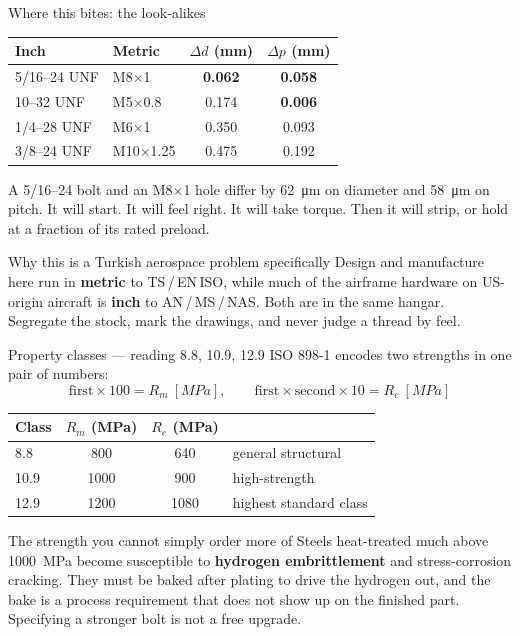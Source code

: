 \documentclass[aspectratio=169,10pt]{beamer}
\begin{document}
\begin{frame}{Where this bites: the look-alikes}
\centering\small
\begin{tabular}{@{}llcc@{}}
\toprule
\textbf{Inch} & \textbf{Metric} & $\Delta d$ (\si{mm}) & $\Delta p$ (\si{mm})\\
\midrule
\rowcolor{red!10} 5/16--24 UNF & M8$\times$1 & \alert{\textbf{0.062}} & \alert{\textbf{0.058}}\\
\rowcolor{red!6} 10--32 UNF & M5$\times$0.8 & 0.174 & \alert{\textbf{0.006}}\\
1/4--28 UNF & M6$\times$1 & 0.350 & 0.093\\
3/8--24 UNF & M10$\times$1.25 & 0.475 & 0.192\\
\bottomrule
\end{tabular}
\vfill
\raggedright
A 5/16--24 bolt and an M8$\times$1 hole differ by \SI{62}{\micro\metre} on diameter and
\SI{58}{\micro\metre} on pitch. \alert{It will start. It will feel right. It will take torque.} Then
it will strip, or hold at a fraction of its rated preload.
\vfill
\begin{alertblock}{Why this is a Turkish aerospace problem specifically}
Design and manufacture here run in \textbf{metric} to TS\,/\,EN\,ISO, while much of the airframe
hardware on US-origin aircraft is \textbf{inch} to AN\,/\,MS\,/\,NAS. Both are in the same hangar.\\[4pt]
Segregate the stock, mark the drawings, and never judge a thread by feel.
\end{alertblock}
\end{frame}

\begin{frame}{Property classes --- reading 8.8, 10.9, 12.9}
ISO 898-1 encodes two strengths in one pair of numbers:
\[
\text{first}\times 100 = R_m\ [\si{MPa}],
\qquad
\text{first}\times\text{second}\times 10 = R_e\ [\si{MPa}]
\]
\vfill
\centering\small
\begin{tabular}{@{}lccl@{}}
\toprule
Class & $R_m$ (\si{MPa}) & $R_e$ (\si{MPa}) & \\
\midrule
8.8 & 800 & 640 & general structural\\
10.9 & 1000 & 900 & high-strength\\
12.9 & 1200 & 1080 & highest standard class\\
\bottomrule
\end{tabular}
\vfill
\raggedright
\begin{alertblock}{The strength you cannot simply order more of}
Steels heat-treated much above \SI{1000}{MPa} become susceptible to \textbf{hydrogen embrittlement}
and stress-corrosion cracking. They must be baked after plating to drive the hydrogen out, and the
bake is a process requirement that does not show up on the finished part.\\[4pt]
\alert{Specifying a stronger bolt is not a free upgrade.}
\end{alertblock}
\end{frame}
\end{document}
